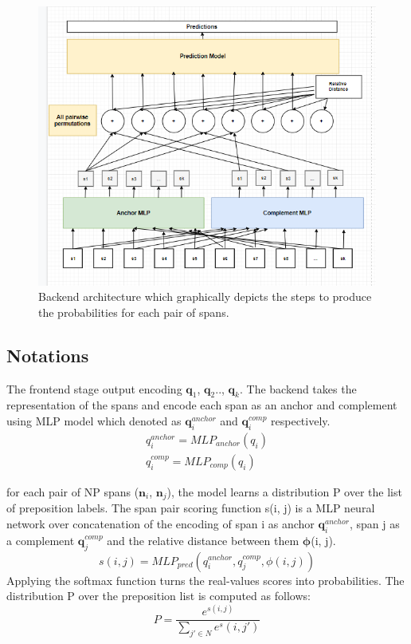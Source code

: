 \documentclass[11pt, a4paper, twocolumn]{article}
\begin{document}
\begin{figure}
    \centering
    \includegraphics[width=\linewidth]{backend.png}
    \caption{Backend architecture which graphically depicts the steps to produce the probabilities for each pair of spans.    }
    \label{fig:my_label}
\end{figure}


\subsection{Notations}
\label{notations}

The frontend stage output encoding $\mathbf{q}_1$, $\mathbf{q}_2$.., $\mathbf{q}_k$.
The backend takes the representation of the spans and encode each span as an anchor and complement using MLP model which denoted as $\mathbf{q}_i^{anchor}$ and $\mathbf{q}_i^{comp}$ respectively. 
\begin{gather}
    q_i^{anchor} = MLP_{anchor} (q_i) \\
    q_i^{comp} = MLP_{comp} (q_i)
\end{gather}

for each pair of NP spans ($\mathbf{n}_i$, $\mathbf{n}_j$), the model learns a distribution P over the list of preposition labels. The span pair scoring function s(i, j) is a MLP neural network over concatenation of
the encoding of span i as anchor $\mathbf{q}_i^{anchor}$, span j as a complement $\mathbf{q}_j^{comp}$ and the relative distance between them $\mathbf{\phi}$(i, j).
\begin{equation} \label{eq:04}
    s(i, j) = MLP_{pred}(q_i^{anchor}, q_j^{comp}, \phi(i, j))
\end{equation}
Applying the softmax function turns the real-values scores into probabilities. The distribution P over the preposition list is computed as follows:
\begin{equation} \label{eq:04}
    P = \dfrac{e^{s(i, j)}}{\sum_{j'\in{N}} e^s(i, j')}
\end{equation}
\end{document}
